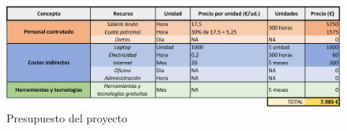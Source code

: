 \begin{figure}[H]
    \centering
    \includegraphics[width=1\linewidth]{text/image/Presupuesto.pdf}
    \caption{Presupuesto del proyecto}
    \label{fig:presupuesto}
\end{figure}